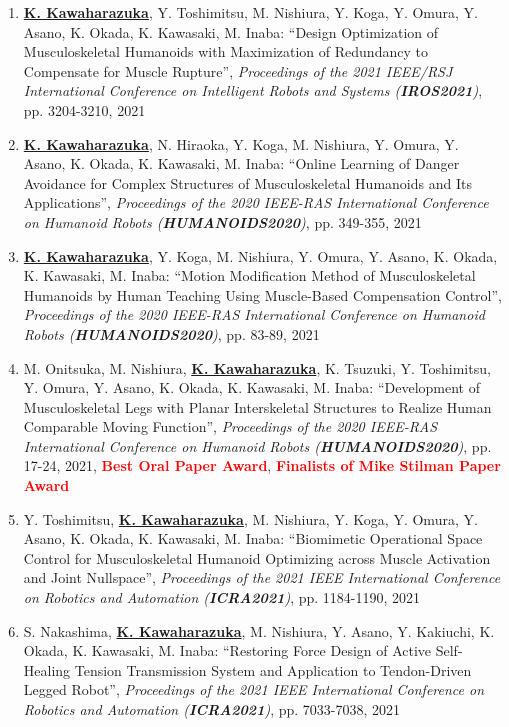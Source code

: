 \documentclass[letterpaper]{article}
\begin{document}
\begin{enumerate}
\item \underline{\textbf{K. Kawaharazuka}}, Y. Toshimitsu, M. Nishiura, Y. Koga, Y. Omura, Y. Asano, K. Okada, K. Kawasaki, M. Inaba: ``Design Optimization of Musculoskeletal Humanoids with Maximization of Redundancy to Compensate for Muscle Rupture'', \textit{Proceedings of the 2021 IEEE/RSJ International Conference on Intelligent Robots and Systems (\textit{\textbf{IROS2021}})}, pp. 3204-3210, 2021
\item \underline{\textbf{K. Kawaharazuka}}, N. Hiraoka, Y. Koga, M. Nishiura, Y. Omura, Y. Asano, K. Okada, K. Kawasaki, M. Inaba: ``Online Learning of Danger Avoidance for Complex Structures of Musculoskeletal Humanoids and Its Applications'', \textit{Proceedings of the 2020 IEEE-RAS International Conference on Humanoid Robots (\textit{\textbf{HUMANOIDS2020}})}, pp. 349-355, 2021
\item \underline{\textbf{K. Kawaharazuka}}, Y. Koga, M. Nishiura, Y. Omura, Y. Asano, K. Okada, K. Kawasaki, M. Inaba: ``Motion Modification Method of Musculoskeletal Humanoids by Human Teaching Using Muscle-Based Compensation Control'', \textit{Proceedings of the 2020 IEEE-RAS International Conference on Humanoid Robots (\textit{\textbf{HUMANOIDS2020}})}, pp. 83-89, 2021
\item M. Onitsuka, M. Nishiura, \underline{\textbf{K. Kawaharazuka}}, K. Tsuzuki, Y. Toshimitsu, Y. Omura, Y. Asano, K. Okada, K. Kawasaki, M. Inaba: ``Development of Musculoskeletal Legs with Planar Interskeletal Structures to Realize Human Comparable Moving Function'', \textit{Proceedings of the 2020 IEEE-RAS International Conference on Humanoid Robots (\textit{\textbf{HUMANOIDS2020}})}, pp. 17-24, 2021, \textbf{\textcolor{red}{Best Oral Paper Award}}, \textbf{\textcolor{red}{Finalists of Mike Stilman Paper Award}}
\item Y. Toshimitsu, \underline{\textbf{K. Kawaharazuka}}, M. Nishiura, Y. Koga, Y. Omura, Y. Asano, K. Okada, K. Kawasaki, M. Inaba: ``Biomimetic Operational Space Control for Musculoskeletal Humanoid Optimizing across Muscle Activation and Joint Nullspace'', \textit{Proceedings of the 2021 IEEE International Conference on Robotics and Automation (\textit{\textbf{ICRA2021}})}, pp. 1184-1190, 2021
\item S. Nakashima, \underline{\textbf{K. Kawaharazuka}}, M. Nishiura, Y. Asano, Y. Kakiuchi, K. Okada, K. Kawasaki, M. Inaba: ``Restoring Force Design of Active Self-Healing Tension Transmission System and Application to Tendon-Driven Legged Robot'', \textit{Proceedings of the 2021 IEEE International Conference on Robotics and Automation (\textit{\textbf{ICRA2021}})}, pp. 7033-7038, 2021

\end{enumerate}
\end{document}
